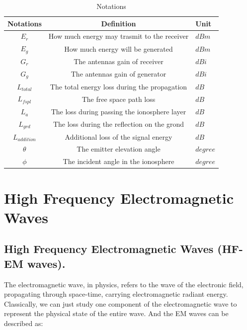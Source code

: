 \documentclass{mcmthesis}
\begin{document}
    \begin{table}[h]
      \centering
        \begin{tabular}{|c|c|l|}

          \hline Notations & Definition & Unit \\
          \hline $E_{r}$ & How much energy may trasmit to the receiver & $dBm$ \\
          \hline $E_{g}$ & How much energy will be generated & $dBm$ \\
          \hline $G_{r}$ & The antennas gain of receiver & $dBi$ \\
          \hline $G_{g}$ & The antennas gain of generator & $dBi$ \\
          \hline $L_{total}$ & The total energy loss during the propagation & $dB$ \\
          \hline $L_{fspl}$ & The free space path loss & $dB$ \\
          \hline $L_{a}$ & The loss during passing the ionosphere layer & $dB$ \\
          \hline $L_{grd}$ & The loss during the reflection on the grond & $dB$ \\
          \hline $L_{addition}$ & Additional loss of the signal energy & $dB$ \\
          \hline $\theta$ & The emitter elevation angle & $degree$ \\
          \hline $\phi$ & The incident angle in the ionosphere & $degree$ \\
          \hline

        \end{tabular}
        \caption{Notations}
    		\label{tab:Notations}
    \end{table}



\section{High Frequency Electromagnetic Waves}
  \subsection{High Frequency Electromagnetic Waves (HF-EM waves).}

    The electromagnetic wave, in physics, refers to the wave of the electronic field, propagating through space-time, carrying electromagnetic radiant energy. Classically, we can just study one component of the electromagnetic wave to represent the physical state of the entire wave. And the EM waves can be described as:
\end{document}
